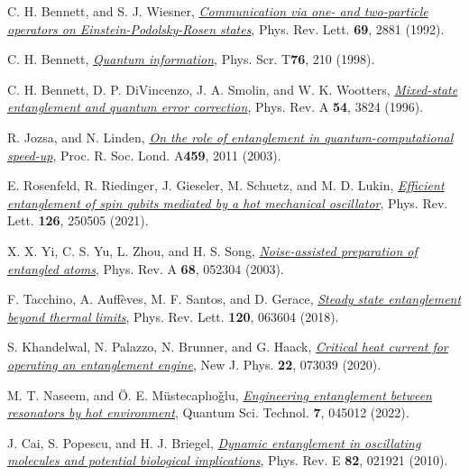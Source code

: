 \documentclass[11pt,a4paper]{article}
\begin{document}
\begin{thebibliography}{99}
    C. H. Bennett, and S. J. Wiesner, \href{https://doi.org/10.1103/PhysRevLett.69.2881}{\textit{Communication via one- and two-particle operators on Einstein-Podolsky-Rosen states}}, Phys. Rev. Lett. \textbf{69}, 2881 (1992).

    C. H. Bennett, \href{https://doi.org/10.1238/Physica.Topical.076a00210}{\textit{Quantum information}}, Phys. Scr. T\textbf{76}, 210 (1998).

    C. H. Bennett, D. P. DiVincenzo, J. A. Smolin, and W. K. Wootters, \href{https://doi.org/10.1103/PhysRevA.54.3824}{\textit{Mixed-state entanglement and quantum error correction}}, Phys. Rev. A \textbf{54}, 3824 (1996).

    R. Jozsa, and N. Linden, \href{https://doi.org/10.1098/rspa.2002.1097}{\textit{On the role of entanglement in quantum-computational speed-up}}, Proc. R. Soc. Lond. A\textbf{459}, 2011 (2003).

    E. Rosenfeld, R. Riedinger, J. Gieseler, M. Schuetz, and M. D. Lukin, \href{https://doi.org/10.1103/PhysRevLett.126.250505}{\textit{Efficient entanglement of spin qubits mediated by a hot mechanical oscillator}}, Phys. Rev. Lett. \textbf{126}, 250505 (2021).

    X. X. Yi, C. S. Yu, L. Zhou, and H. S. Song, \href{https://doi.org/10.1103/PhysRevA.68.052304}{\textit{Noise-assisted preparation of entangled atoms}}, Phys. Rev. A \textbf{68}, 052304 (2003).

    F. Tacchino, A. Auff\`{e}ves, M. F. Santos, and D. Gerace, \href{https://doi.org/10.1103/PhysRevLett.120.063604}{\textit{Steady state entanglement beyond thermal limits}}, Phys. Rev. Lett. \textbf{120}, 063604 (2018).

    S. Khandelwal, N. Palazzo, N. Brunner, and G. Haack, \href{https://doi.org/10.1088/1367-2630/ab9983}{\textit{Critical heat current for operating an entanglement engine}},  New J. Phys. \textbf{22}, 073039 (2020).

    M. T. Naseem, and \"O. E. M\"ustecapl{\i}o\v{g}lu, \href{https://doi.org/10.1088/2058-9565/ac7f50}{\textit{Engineering entanglement between resonators by hot environment}}, Quantum Sci. Technol. \textbf{7}, 045012 (2022).

    J. Cai, S. Popescu, and H. J. Briegel, \href{https://doi.org/10.1103/PhysRevE.82.021921}{\textit{Dynamic entanglement in oscillating molecules and potential biological implications}}, Phys. Rev. E \textbf{82}, 021921 (2010).


\end{thebibliography}
\end{document}
